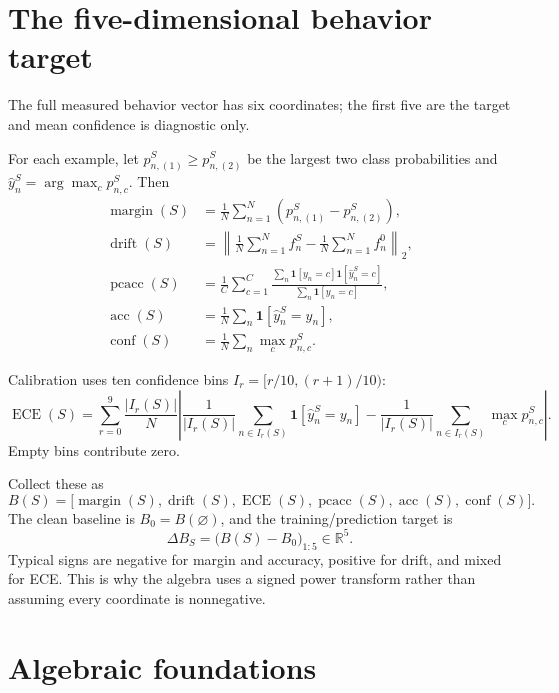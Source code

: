 \documentclass[11pt,a4paper]{article}
\newcommand{\R}{\mathbb{R}}
\newcommand{\ind}{\mathbf{1}}
\newcommand{\dB}{\Delta B}
\newcommand{\ECE}{\operatorname{ECE}}
\newcommand{\pcacc}{\operatorname{pcacc}}
\newcommand{\acc}{\operatorname{acc}}
\newcommand{\conf}{\operatorname{conf}}
\newcommand{\margin}{\operatorname{margin}}
\newcommand{\drift}{\operatorname{drift}}
\begin{document}
\section{The five-dimensional behavior target}

The full measured behavior vector has six coordinates; the first five are the
target and mean confidence is diagnostic only.

For each example, let $p_{n,(1)}^S\ge p_{n,(2)}^S$ be the largest two class
probabilities and $\hat y_n^S=\arg\max_c p_{n,c}^S$.  Then
\begin{align}
\margin(S)&=\frac1N\sum_{n=1}^N\left(p_{n,(1)}^S-p_{n,(2)}^S\right),\\
\drift(S)&=\left\|\frac1N\sum_{n=1}^N f_n^S-
\frac1N\sum_{n=1}^N f_n^0\right\|_2,\\
\pcacc(S)&=\frac1C\sum_{c=1}^{C}
\frac{\sum_n\ind[y_n=c]\ind[\hat y_n^S=c]}{\sum_n\ind[y_n=c]},\\
\acc(S)&=\frac1N\sum_n\ind[\hat y_n^S=y_n],\\
\conf(S)&=\frac1N\sum_n\max_c p_{n,c}^S.
\end{align}

Calibration uses ten confidence bins $I_r=[r/10,(r+1)/10)$:
\begin{equation}
\ECE(S)=\sum_{r=0}^{9}\frac{|I_r(S)|}{N}
\left|
\frac{1}{|I_r(S)|}\sum_{n\in I_r(S)}\ind[\hat y_n^S=y_n]
-
\frac{1}{|I_r(S)|}\sum_{n\in I_r(S)}\max_c p_{n,c}^S
\right|.
\end{equation}
Empty bins contribute zero.

Collect these as
\[
B(S)=\big[\margin(S),\drift(S),\ECE(S),\pcacc(S),\acc(S),\conf(S)\big].
\]
The clean baseline is $B_0=B(\varnothing)$, and the training/prediction target is
\begin{equation}
\boxed{
\dB_S=\big(B(S)-B_0\big)_{1:5}\in\R^5.
}
\label{eq:behavior}
\end{equation}
Typical signs are negative for margin and accuracy, positive for drift, and
mixed for ECE.  This is why the algebra uses a signed power transform rather
than assuming every coordinate is nonnegative.

\section{Algebraic foundations}
\end{document}
